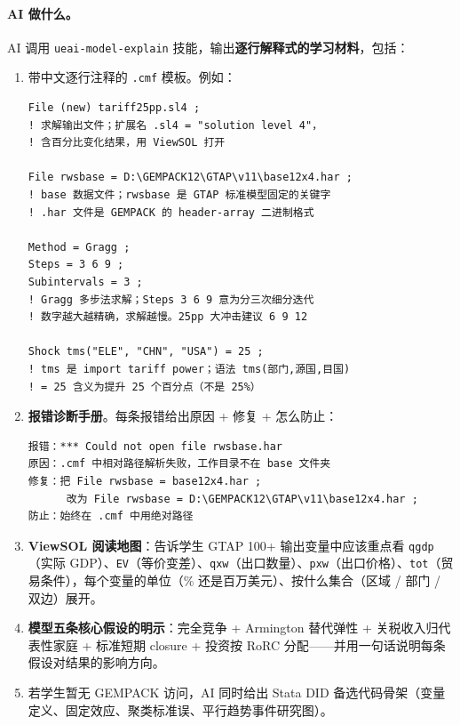 \documentclass[12pt,a4paper]{article}
\begin{document}
\paragraph{AI 做什么。}AI 调用 \texttt{ueai-model-explain} 技能，输出\textbf{逐行解释式的学习材料}，包括：

\begin{enumerate}[leftmargin=*]
  \item 带中文逐行注释的 \texttt{.cmf} 模板。例如：
\begin{lstlisting}[style=md,basicstyle=\ttfamily\scriptsize]
File (new) tariff25pp.sl4 ;
! 求解输出文件；扩展名 .sl4 = "solution level 4"，
! 含百分比变化结果，用 ViewSOL 打开

File rwsbase = D:\GEMPACK12\GTAP\v11\base12x4.har ;
! base 数据文件；rwsbase 是 GTAP 标准模型固定的关键字
! .har 文件是 GEMPACK 的 header-array 二进制格式

Method = Gragg ;
Steps = 3 6 9 ;
Subintervals = 3 ;
! Gragg 多步法求解；Steps 3 6 9 意为分三次细分迭代
! 数字越大越精确，求解越慢。25pp 大冲击建议 6 9 12

Shock tms("ELE", "CHN", "USA") = 25 ;
! tms 是 import tariff power；语法 tms(部门,源国,目国)
! = 25 含义为提升 25 个百分点（不是 25%）
\end{lstlisting}

  \item \textbf{报错诊断手册}。每条报错给出原因 + 修复 + 怎么防止：
\begin{lstlisting}[style=md,basicstyle=\ttfamily\scriptsize]
报错：*** Could not open file rwsbase.har
原因：.cmf 中相对路径解析失败，工作目录不在 base 文件夹
修复：把 File rwsbase = base12x4.har ;
      改为 File rwsbase = D:\GEMPACK12\GTAP\v11\base12x4.har ;
防止：始终在 .cmf 中用绝对路径
\end{lstlisting}

  \item \textbf{ViewSOL 阅读地图}：告诉学生 GTAP 100+ 输出变量中应该重点看 \texttt{qgdp}（实际 GDP）、\texttt{EV}（等价变差）、\texttt{qxw}（出口数量）、\texttt{pxw}（出口价格）、\texttt{tot}（贸易条件），每个变量的单位（\% 还是百万美元）、按什么集合（区域 / 部门 / 双边）展开。

  \item \textbf{模型五条核心假设的明示}：完全竞争 + Armington 替代弹性 + 关税收入归代表性家庭 + 标准短期 closure + 投资按 RoRC 分配——并用一句话说明每条假设对结果的影响方向。

  \item 若学生暂无 GEMPACK 访问，AI 同时给出 Stata DID 备选代码骨架（变量定义、固定效应、聚类标准误、平行趋势事件研究图）。
\end{enumerate}
\end{document}

